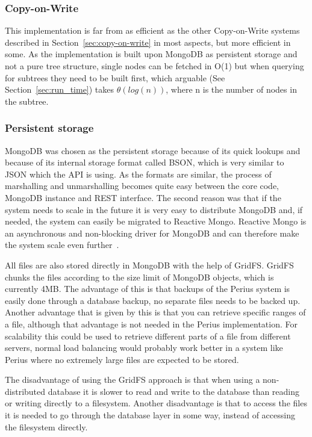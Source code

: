 \documentclass[a4paper,12pt]{article}
\newcounter{subsubsubsection}[subsubsection]
\begin{document}
\subsubsection{Copy-on-Write}
This implementation is far from as efficient as the other Copy-on-Write systems described in
Section~\ref{sec:copy-on-write} in most aspects, but more efficient in some. As the implementation
is built upon MongoDB as persistent storage and not a pure tree structure, single nodes can be
fetched in O(1) but when querying for subtrees they need to be built first, which arguable (See
Section~\ref{sec:run_time}) takes $\theta(log(n))$, where n is the number of nodes in the subtree. 

\subsubsection{Persistent storage} \label{sec:persistent_storage}
MongoDB was chosen as the persistent storage because of its quick lookups and because of its
internal storage format called BSON, which is very similar to JSON which the API is using. As the
formats are similar, the process of marshalling and unmarshalling becomes quite easy between the
core code, MongoDB instance and REST interface.  The second reason was that if the system needs to
scale in the future it is very easy to distribute MongoDB and, if needed, the system can easily be
migrated to Reactive Mongo. Reactive Mongo is an asynchronous and non-blocking driver for MongoDB
and can therefore make the system scale even further~\cite{REACTIVEMONGO}.

All files are also stored directly in MongoDB with the help of GridFS. GridFS chunks the files 
according to the size limit of MongoDB objects, which is currently 4MB. The advantage of this is 
that backups of the Perius system is easily done through a database backup, no separate files 
needs to be backed up. Another advantage that is given by this is that you can retrieve specific 
ranges of a file, although that advantage is not needed in the Perius implementation. For
scalability this could be used to retrieve different parts of a file from different servers, 
normal load balancing would probably work better in a system like Perius where no extremely large 
files are expected to be stored. 

The disadvantage of using the GridFS approach is that when using a non-distributed database 
it is slower to read and write to the database than reading or writing directly to a filesystem. 
Another disadvantage is that to access the files it is needed to go through the database layer 
in some way, instead of accessing the filesystem directly.
\end{document}
